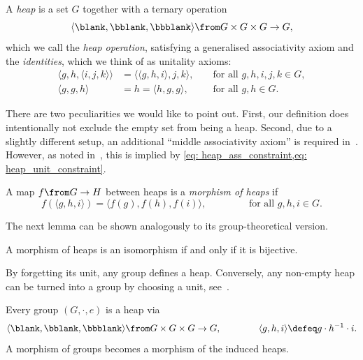 \begin{definition}\label{def: heap}
  A \emph{heap} is a set \(G\) together with a ternary operation
  \[
    \langle \blank , \bblank, \bbblank\rangle \from G\times G \times G \to G,
  \]
  which we call the \emph{heap operation},
  satisfying a generalised associativity axiom and the \emph{\Malcev{} identities},
  which we think of as unitality axioms:
  \begin{align}
    \langle g, h, \langle i,j,k\rangle \rangle &= \langle \langle g,h,i\rangle , j , k \rangle, &&\text{ for all } g,h, i ,j, k \in G,
                                                   \label{eq: heap_ass_constraint} \\
    \langle g, g, h \rangle &= h = \langle h, g, g \rangle, &&\text{ for all } g, h \in G.
                                       \label{eq: heap_unit_constraint}
  \end{align}
\end{definition}

There are two peculiarities we would like to point out.
First, our definition does intentionally not exclude the empty set from being a heap.
Second, due to a slightly different setup,
an additional ``middle associativity axiom'' is required in~\cite{Hollings2017}.
However, as noted in~\cite[Lemma~2.3]{Brzezinski2020}, this is implied by
\cref{eq: heap_ass_constraint,eq: heap_unit_constraint}.

\begin{definition}\label{def: morphism_of_heaps}
  A map \(f \from G \to H\) between heaps is a \emph{morphism of heaps} if
  \[
    f \left( \langle g, h, i\rangle \right) = \langle f(g), f(h), f(i) \rangle, \qquad \qquad \text{ for all } g,h, i \in G.
  \]
\end{definition}

The next lemma can be shown analogously to its group-theoretical version.

\begin{lemma}\label{lem: isomorphisms_of_heaps}
  A morphism of heaps is an isomorphism if and only if it is bijective.
\end{lemma}

By forgetting its unit, any group defines a heap.
Conversely, any non-empty heap can be turned into a group
by choosing a unit, see~\cite{Certaine1943}.

\begin{lemma}\label{lem: groups_to_heaps}
  Every group \((G, \cdot, e)\) is a heap via
  \[
    \langle \blank,\bblank,\bbblank \rangle \from G\times G \times G \to G, \qquad \qquad \langle g, h, i \rangle \defeq g \cdot h^{-1} \cdot i.
  \]
  A morphism of groups becomes a morphism of the induced heaps.
\end{lemma}

